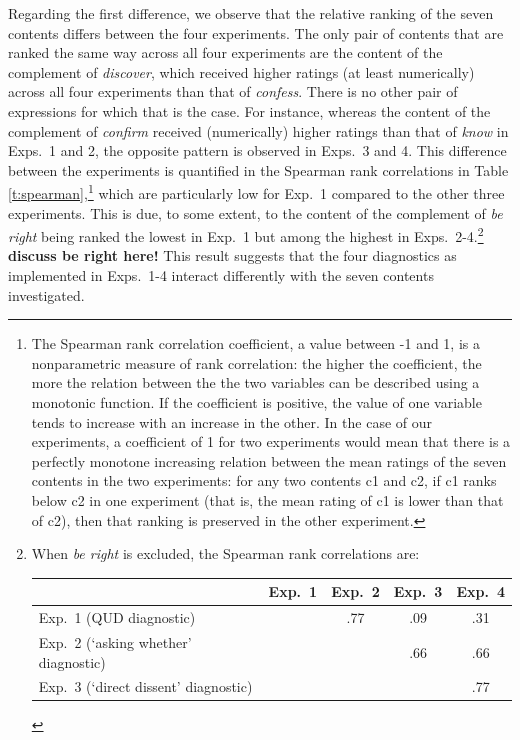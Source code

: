 \documentclass[times,linguex,xcolor]{glossa}
\begin{document}
  Regarding the first difference, we observe that the relative ranking of the seven contents differs between the four experiments. The only pair of contents that are ranked the same way across all four experiments are the content of the complement of \emph{discover}, which received higher ratings (at least numerically) across all four experiments than that of \emph{confess}. There is no other pair of expressions for which that is the case. For instance, whereas the content of the complement of \emph{confirm} received (numerically) higher ratings than that of \emph{know} in Exps.~1 and 2, the opposite pattern is observed in Exps.~3 and 4. This difference between the experiments is quantified in the Spearman rank correlations in Table \ref{t:spearman},\footnote{The Spearman rank correlation coefficient, a value between -1 and 1, is a nonparametric measure of rank correlation: the higher the coefficient, the more the relation between the the two variables can be described using a monotonic function. If the coefficient is positive, the value of one variable tends to increase with an increase in the other. In the case of our experiments, a coefficient of 1 for two experiments would mean that there is a perfectly monotone increasing relation between the mean ratings of the seven contents in the two experiments: for any two contents c1 and c2, if c1 ranks below c2 in one experiment (that is, the mean rating of c1 is lower than that of c2), then that ranking is preserved in the other experiment.} which are particularly low for Exp.~1 compared to the other three experiments. This is due, to some extent, to the content of the complement of \emph{be right} being ranked the lowest in Exp.~1 but among the highest in Exps.~2-4.\footnote{When \emph{be right} is excluded, the Spearman rank correlations are:
  
 \begin{tabular}{l | c c c c}
 & Exp.~1 & Exp.~2 & Exp.~3 & Exp.~4 \\ \hline
 Exp.~1 (QUD diagnostic) & \cellcolor{lightgray} & .77 & .09 & .31 \\
 Exp.~2 (`asking whether' diagnostic) & \cellcolor{lightgray} & \cellcolor{lightgray} & .66 & .66 \\
 Exp.~3 (`direct dissent' diagnostic) & \cellcolor{lightgray}& \cellcolor{lightgray} & \cellcolor{lightgray} & .77  \\
 \hline
 \end{tabular}} {\bf discuss be right here!} This result suggests that the four diagnostics as implemented in Exps.~1-4 interact differently with the seven contents investigated.
 
\end{document}
